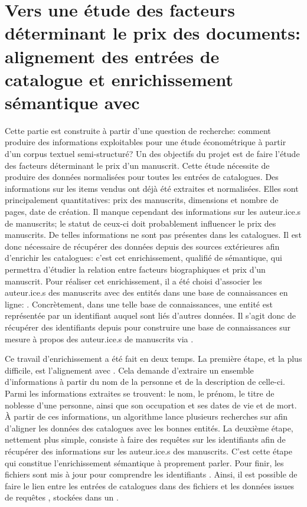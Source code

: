 

\part{Vers une étude des facteurs déterminant le prix des documents: alignement des entrées de catalogue et enrichissement sémantique avec \wkd{}}

Cette partie est construite à partir d'une question de recherche: comment produire des informations exploitables pour une étude économétrique à partir d'un corpus textuel semi-structuré? Un des objectifs du projet est de faire l'étude des facteurs déterminant le prix d'un manuscrit. Cette étude nécessite de produire des données normalisées pour toutes les entrées de catalogues. Des informations sur les items vendus ont déjà été extraites et normalisées. Elles sont principalement quantitatives: prix des manuscrits, dimensions et nombre de pages, date de création. Il manque cependant des informations sur les auteur.ice.s de manuscrits; le statut de ceux-ci doit probablement influencer le prix des manuscrits. De telles informations ne sont pas présentes dans les catalogues. Il est donc nécessaire de récupérer des données depuis des sources extérieures afin d'enrichir les catalogues: c'est cet enrichissement, qualifié de sémantique, qui permettra d'étudier la relation entre facteurs biographiques et prix d'un manuscrit. Pour réaliser cet enrichissement, il a été choisi d'associer les auteur.ice.s des manuscrits avec des entités dans une base de connaissances en ligne: \wkd{}. Concrètement, dans une telle base de connaissances, une entité est représentée par un identifiant auquel sont liés d'autres données. Il s'agit donc de récupérer des identifiants depuis \wkd{} pour construire une base de connaissances sur mesure à propos des auteur.ice.s de manuscrits via \sparql{}.

Ce travail d'enrichissement a été fait en deux temps. La première étape, et la plus difficile, est l'alignement avec \wkd{}. Cela demande d'extraire un ensemble d'informations à partir du nom de la personne et de la description de celle-ci. Parmi les informations extraites se trouvent: le nom, le prénom, le titre de noblesse d'une personne, ainsi que son occupation et ses dates de vie et de mort. À partir de ces informations, un algorithme lance plusieurs recherches sur \wkd{} afin d'aligner les données des catalogues avec les bonnes entités. La deuxième étape, nettement plus simple, consiste à faire des requêtes \sparql{} sur les identifiants \wkd{} afin de récupérer des informations sur les auteur.ice.s des manuscrits. C'est cette étape qui constitue l'enrichissement sémantique à proprement parler. Pour finir, les fichiers \tei{} sont mis à jour pour comprendre les identifiants \wkd{}. Ainsi, il est possible de faire le lien entre les entrées de catalogues dans des fichiers \xml{} et les données issues de requêtes \sparql{}, stockées dans un \json{}.

